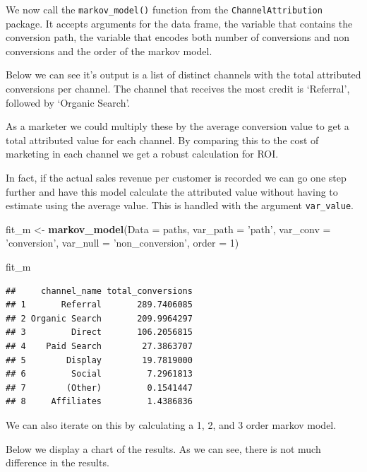 \documentclass[]{book}
\newenvironment{Shaded}{\begin{snugshade}}{\end{snugshade}}
\newcommand{\KeywordTok}[1]{\textcolor[rgb]{0.13,0.29,0.53}{\textbf{#1}}}
\newcommand{\DataTypeTok}[1]{\textcolor[rgb]{0.13,0.29,0.53}{#1}}
\newcommand{\DecValTok}[1]{\textcolor[rgb]{0.00,0.00,0.81}{#1}}
\newcommand{\StringTok}[1]{\textcolor[rgb]{0.31,0.60,0.02}{#1}}
\newcommand{\NormalTok}[1]{#1}
\begin{document}
We now call the \texttt{markov\_model()} function from the
\texttt{ChannelAttribution} package. It accepts arguments for the data
frame, the variable that contains the conversion path, the variable that
encodes both number of conversions and non conversions and the order of
the markov model.

Below we can see it's output is a list of distinct channels with the
total attributed conversions per channel. The channel that receives the
most credit is `Referral', followed by `Organic Search'.

As a marketer we could multiply these by the average conversion value to
get a total attributed value for each channel. By comparing this to the
cost of marketing in each channel we get a robust calculation for ROI.

In fact, if the actual sales revenue per customer is recorded we can go
one step further and have this model calculate the attributed value
without having to estimate using the average value. This is handled with
the argument \texttt{var\_value}.

\begin{Shaded}
\begin{Highlighting}[]
\NormalTok{fit_m <-}\StringTok{ }\KeywordTok{markov_model}\NormalTok{(}\DataTypeTok{Data =}\NormalTok{ paths, }
                      \DataTypeTok{var_path =} \StringTok{'path'}\NormalTok{, }
                      \DataTypeTok{var_conv =} \StringTok{'conversion'}\NormalTok{, }
                      \DataTypeTok{var_null =} \StringTok{'non_conversion'}\NormalTok{, }
                      \DataTypeTok{order =} \DecValTok{1}\NormalTok{)}

\NormalTok{fit_m}
\end{Highlighting}
\end{Shaded}

\begin{verbatim}
##     channel_name total_conversions
## 1       Referral       289.7406085
## 2 Organic Search       209.9964297
## 3         Direct       106.2056815
## 4    Paid Search        27.3863707
## 5        Display        19.7819000
## 6         Social         7.2961813
## 7        (Other)         0.1541447
## 8     Affiliates         1.4386836
\end{verbatim}

We can also iterate on this by calculating a 1, 2, and 3 order markov
model.

Below we display a chart of the results. As we can see, there is not
much difference in the results.
\end{document}
